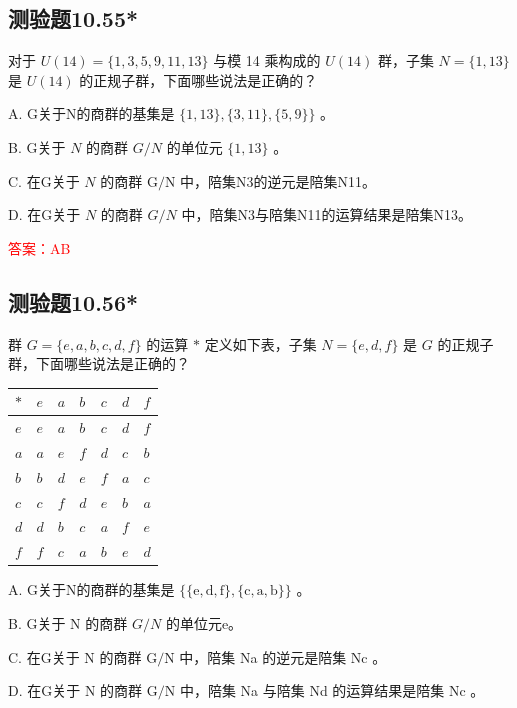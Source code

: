 \documentclass[UTF8, heading=true]{ctexart}
\begin{document}
\subsection{测验题10.55*}

对于 $U(14)=\{1,3,5,9,11,13\}$ 与模 14 乘构成的 $U(14)$ 群，子集 $N=\{1,13\}$ 是 $U(14)$ 的正规子群，下面哪些说法是正确的？

A. G关于N的商群的基集是 $\{1,13\},\{3,11\},\{5,9\}\}$ 。

B. G关于 $N$ 的商群 $G / N$ 的单位元 $\{1,13\}$ 。

C. 在G关于 $N$ 的商群 $\mathrm{G} / \mathrm{N}$ 中，陪集N3的逆元是陪集N11。

D. 在G关于 $N$ 的商群 $G / N$ 中，陪集N3与陪集N11的运算结果是陪集N13。

\textcolor{red}{答案：AB}

\subsection{测验题10.56*}

群 $G=\{e, a, b, c, d, f\}$ 的运算 $*$ 定义如下表，子集 $N=\{e, d, f\}$ 是 $G$ 的正规子群，下面哪些说法是正确的？

\begin{table}[H]
  \renewcommand{\arraystretch}{1.5}
  \centering
\begin{tabular}{l|llllll}
\hline$*$ & $e$ & $a$ & $b$ & $c$ & $d$ & $f$ \\
\hline$e$ & $e$ & $a$ & $b$ & $c$ & $d$ & $f$ \\
$a$ & $a$ & $e$ & $f$ & $d$ & $c$ & $b$ \\
$b$ & $b$ & $d$ & $e$ & $f$ & $a$ & $c$ \\
$c$ & $c$ & $f$ & $d$ & $e$ & $b$ & $a$ \\
$d$ & $d$ & $b$ & $c$ & $a$ & $f$ & $e$ \\
$f$ & $f$ & $c$ & $a$ & $b$ & $e$ & $d$ \\
\hline
\end{tabular}
\end{table}

A. G关于N的商群的基集是 $\{\{\mathrm{e}, \mathrm{d}, \mathrm{f}\},\{\mathrm{c}, \mathrm{a}, \mathrm{b}\}\}$ 。

B. G关于 N 的商群 $G / N$ 的单位元e。

C. 在G关于 N 的商群 $\mathrm{G} / \mathrm{N}$ 中，陪集 Na 的逆元是陪集 Nc 。

D. 在G关于 N 的商群 $\mathrm{G} / \mathrm{N}$ 中，陪集 Na 与陪集 Nd 的运算结果是陪集 Nc 。
\end{document}

